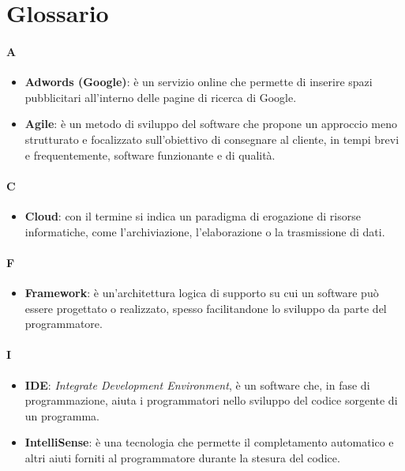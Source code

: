 \appendix
\newpage



\chapter{Glossario}

\subsubsection{A}
\begin{itemize}
	\item \textbf{Adwords (Google)}: è un servizio online che permette di inserire spazi pubblicitari all'interno delle pagine di ricerca di Google.
	\item \textbf{Agile}: è un metodo di sviluppo del software che propone un approccio meno strutturato e focalizzato sull'obiettivo di consegnare al cliente, in tempi brevi e frequentemente, software funzionante e di qualità.
\end{itemize}

\subsubsection{C}
\begin{itemize}
	\item \textbf{Cloud}: con il termine si indica un paradigma di erogazione di risorse informatiche, come l'archiviazione, l'elaborazione o la trasmissione di dati.
\end{itemize}

\subsubsection{F}
\begin{itemize}
	\item \textbf{Framework}: è un'architettura logica di supporto su cui un software può essere progettato o realizzato, spesso facilitandone lo sviluppo da parte del programmatore.
\end{itemize}

\subsubsection{I}
\begin{itemize}
	\item \textbf{IDE}: \textit{Integrate Development Environment}, è un software che, in fase di programmazione, aiuta i programmatori nello sviluppo del codice sorgente di un programma.
	\item \textbf{IntelliSense}: è una tecnologia che permette il completamento automatico e altri aiuti forniti al programmatore durante la stesura del codice.
\end{itemize}

